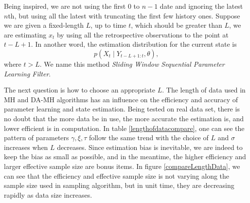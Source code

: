 Being inspired, we are not using the first $0$ to $n-1$ date and ignoring the latest $n$th, but using all the latest with truncating the first few history ones. Suppose we are given a fixed-length $L$, up to time $t$, which should be greater than $L$, we are estimating $x_t$ by using all the retrospective observations to the point at $t-L+1$. In another word, the estimation distribution for the current state is 
\begin{equation}
p(X_{t}\mid Y_{t-L+1:t},\theta),
\end{equation}
where $t>L$. We name this method \textit{Sliding Window Sequential Parameter Learning Filter}. 

The next question is how to choose an appropriate $L$. The length of data used in MH and DA-MH algorithms has an influence on the efficiency and accuracy of parameter learning and state estimation. Being tested on real data set, there is no doubt that the more data be in use, the more accurate the estimation is, and lower efficient is in computation. In table \ref{lengthofdatacompare}, one can see the pattern of parameters $\gamma,\xi,\tau$ follow the same trend with the choice of $L$ and $\sigma$ increases when $L$ decreases. Since estimation bias is inevitable, we are indeed to keep the bias as small as possible, and in the meantime, the higher efficiency and larger effective sample size are bonus items. In figure \ref{compareLengthData}, we can see that the efficiency and effective sample size is not varying along the sample size used in sampling algorithm, but in unit time, they are decreasing rapidly as data size increases. 
